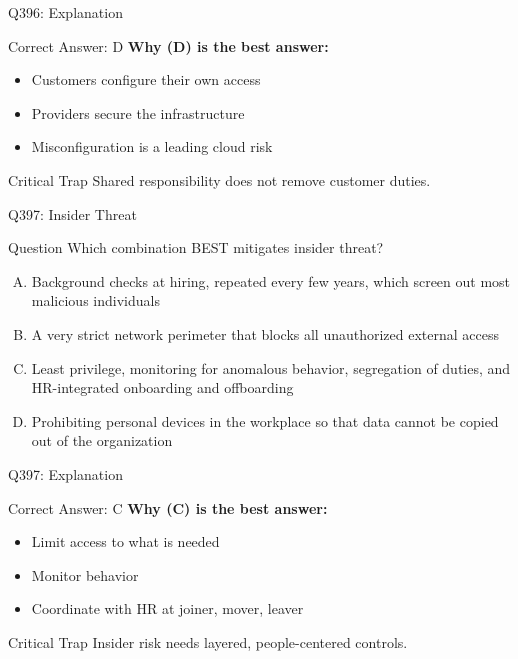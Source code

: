 \documentclass{beamer}
\begin{document}
	\begin{frame}{Q396: Explanation}
		\begin{block}{Correct Answer: D}
			\textbf{Why (D) is the best answer:}
			\begin{itemize}
				\item Customers configure their own access
				\item Providers secure the infrastructure
				\item Misconfiguration is a leading cloud risk
			\end{itemize}
		\end{block}
		\begin{alertblock}{Critical Trap}
			Shared responsibility does not remove customer duties.
		\end{alertblock}
	\end{frame}
	
	\begin{frame}{Q397: Insider Threat}
		\begin{block}{Question}
			\small Which combination BEST mitigates insider threat?
		\end{block}
		\begin{enumerate}[(A)]
			\footnotesize
			\item Background checks at hiring, repeated every few years, which screen out most malicious individuals
			\item A very strict network perimeter that blocks all unauthorized external access
			\item Least privilege, monitoring for anomalous behavior, segregation of duties, and HR-integrated onboarding and offboarding
			\item Prohibiting personal devices in the workplace so that data cannot be copied out of the organization
		\end{enumerate}
	\end{frame}
	
	\begin{frame}{Q397: Explanation}
		\begin{block}{Correct Answer: C}
			\textbf{Why (C) is the best answer:}
			\begin{itemize}
				\item Limit access to what is needed
				\item Monitor behavior
				\item Coordinate with HR at joiner, mover, leaver
			\end{itemize}
		\end{block}
		\begin{alertblock}{Critical Trap}
			Insider risk needs layered, people-centered controls.
		\end{alertblock}
	\end{frame}
	
\end{document}

